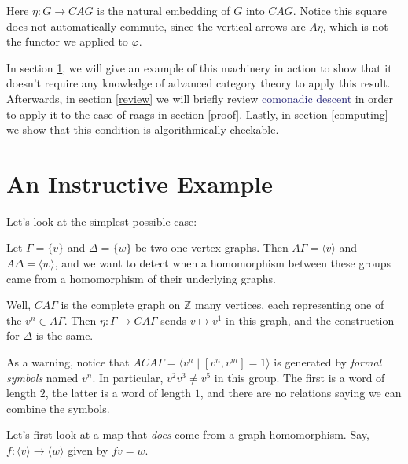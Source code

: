 \documentclass[12pt]{article}
\theoremstyle{definition}
\theoremstyle{theorem}
\newcommand*{\important}[1]{\textcolor{MidnightBlue}{#1}}
\begin{document}
    Here $\eta : G \to CAG$ is the natural embedding of $G$ into $CAG$.
    Notice this square does not automatically commute, since the vertical
    arrows are $A \eta$, which is not the functor we applied to $\varphi$.

    In section \ref{eg}, we will give an example of this machinery in action
    to show that it doesn't require any knowledge of advanced category theory
    to apply this result. Afterwards, in section \ref{review} 
    we will briefly review \important{comonadic descent} in order to apply it
    to the case of raags in section \ref{proof}. Lastly, in section \ref{computing}
    we show that this condition is algorithmically checkable. 




\section{An Instructive Example}
\label{eg}

Let's look at the simplest possible case:



Let $\Gamma = \{ v \}$ and $\Delta = \{ w \}$ be two one-vertex graphs.
Then $A \Gamma = \langle v \rangle$ and $A \Delta = \langle w \rangle$,
and we want to detect when a homomorphism between these groups came from a
homomorphism of their underlying graphs.

Well, $CA \Gamma$ is the complete graph on $\mathbb{Z}$ many vertices, each
representing one of the $v^n \in A \Gamma$. 
Then $\eta : \Gamma \to CA \Gamma$ sends $v \mapsto v^1$ in this graph,
and the construction for $\Delta$ is the same.

As a warning, notice that $ACA\Gamma = \langle v^n \mid [v^n, v^m] = 1 \rangle$
is generated by \emph{formal symbols} named $v^n$. In particular,
$v^2 v^3 \neq v^5$ in this group. The first is a word of length $2$, the latter
is a word of length $1$, and there are no relations saying we can combine
the symbols.

\bigskip

Let's first look at a map that \emph{does} come from a graph homomorphism.
Say, $f : \langle v \rangle \to \langle w \rangle$ given by $fv = w$.
\end{document}
